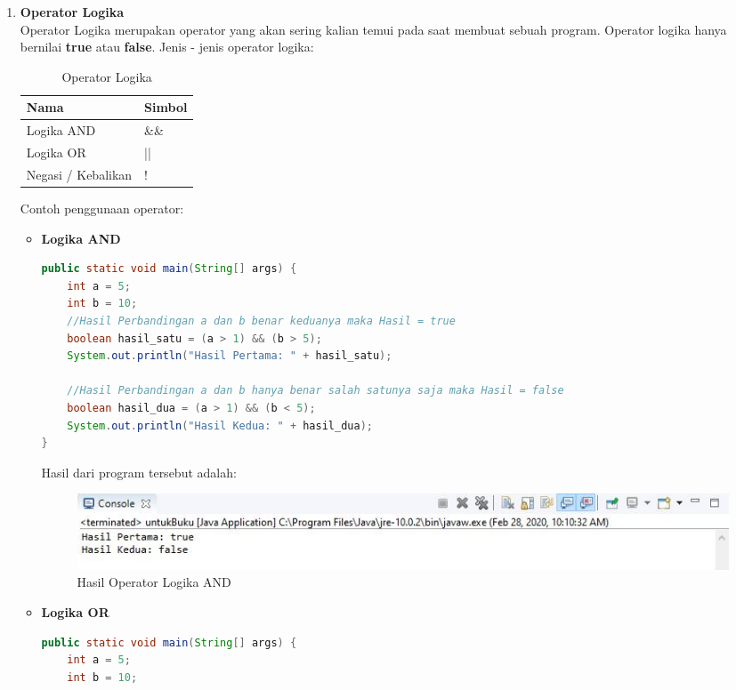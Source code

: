 \begin{enumerate}
    \newpage
    \item \textbf{Operator Logika}\\
    Operator Logika merupakan operator yang akan sering kalian temui pada saat membuat sebuah program. Operator logika hanya bernilai \textbf{true} atau \textbf{false}. Jenis - jenis operator logika:
    \begin{table}[h!]
        \centering
        \begin{tabular}{|l|l|}
        \hline
        \rowcolor[HTML]{9AFF99} 
        \textbf{Nama}      & \textbf{Simbol} \\ \hline
        Logika AND         & \&\&            \\ \hline
        Logika OR          & ||              \\ \hline
        Negasi / Kebalikan & !               \\ \hline
        \end{tabular}
        \caption{Operator Logika}
    \end{table}

    Contoh penggunaan operator:
    \begin{itemize}
        \item \textbf{Logika AND}
        \begin{lstlisting}[language=Java]
public static void main(String[] args) {
    int a = 5;
    int b = 10;
    //Hasil Perbandingan a dan b benar keduanya maka Hasil = true
    boolean hasil_satu = (a > 1) && (b > 5);
    System.out.println("Hasil Pertama: " + hasil_satu);
    
    //Hasil Perbandingan a dan b hanya benar salah satunya saja maka Hasil = false
    boolean hasil_dua = (a > 1) && (b < 5);
    System.out.println("Hasil Kedua: " + hasil_dua);
}            
        \end{lstlisting}
        Hasil dari program tersebut adalah:
        \begin{figure}[htbp!]
            \centering
            \includegraphics[scale=0.6]{pictures/hasil_operator_logika_AND.JPG}
            \caption{Hasil Operator Logika AND}
            \label{}
        \end{figure}

        \item \textbf{Logika OR}
        \begin{lstlisting}[language=Java]
public static void main(String[] args) {
    int a = 5;
    int b = 10;
                

\end{lstlisting}
\end{itemize}
\end{enumerate}
